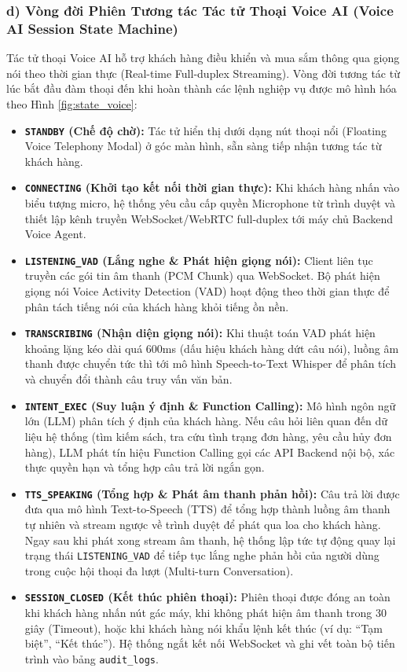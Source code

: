 \documentclass[11pt, a4paper]{report}
\begin{document}
\subsubsection{d) Vòng đời Phiên Tương tác Tác tử Thoại Voice AI (Voice AI Session State Machine)}

Tác tử thoại Voice AI hỗ trợ khách hàng điều khiển và mua sắm thông qua giọng nói theo thời gian thực (Real-time Full-duplex Streaming). Vòng đời tương tác từ lúc bắt đầu đàm thoại đến khi hoàn thành các lệnh nghiệp vụ được mô hình hóa theo Hình \ref{fig:state_voice}:
\begin{itemize}
    \item \textbf{\texttt{STANDBY} (Chế độ chờ):} Tác tử hiển thị dưới dạng nút thoại nổi (Floating Voice Telephony Modal) ở góc màn hình, sẵn sàng tiếp nhận tương tác từ khách hàng.
    \item \textbf{\texttt{CONNECTING} (Khởi tạo kết nối thời gian thực):} Khi khách hàng nhấn vào biểu tượng micro, hệ thống yêu cầu cấp quyền Microphone từ trình duyệt và thiết lập kênh truyền WebSocket/WebRTC full-duplex tới máy chủ Backend Voice Agent.
    \item \textbf{\texttt{LISTENING\_VAD} (Lắng nghe \& Phát hiện giọng nói):} Client liên tục truyền các gói tin âm thanh (PCM Chunk) qua WebSocket. Bộ phát hiện giọng nói Voice Activity Detection (VAD) hoạt động theo thời gian thực để phân tách tiếng nói của khách hàng khỏi tiếng ồn nền.
    \item \textbf{\texttt{TRANSCRIBING} (Nhận diện giọng nói):} Khi thuật toán VAD phát hiện khoảng lặng kéo dài quá 600ms (dấu hiệu khách hàng dứt câu nói), luồng âm thanh được chuyển tức thì tới mô hình Speech-to-Text Whisper để phân tích và chuyển đổi thành câu truy vấn văn bản.
    \item \textbf{\texttt{INTENT\_EXEC} (Suy luận ý định \& Function Calling):} Mô hình ngôn ngữ lớn (LLM) phân tích ý định của khách hàng. Nếu câu hỏi liên quan đến dữ liệu hệ thống (tìm kiếm sách, tra cứu tình trạng đơn hàng, yêu cầu hủy đơn hàng), LLM phát tín hiệu Function Calling gọi các API Backend nội bộ, xác thực quyền hạn và tổng hợp câu trả lời ngắn gọn.
    \item \textbf{\texttt{TTS\_SPEAKING} (Tổng hợp \& Phát âm thanh phản hồi):} Câu trả lời được đưa qua mô hình Text-to-Speech (TTS) để tổng hợp thành luồng âm thanh tự nhiên và stream ngược về trình duyệt để phát qua loa cho khách hàng. Ngay sau khi phát xong stream âm thanh, hệ thống lập tức tự động quay lại trạng thái \texttt{LISTENING\_VAD} để tiếp tục lắng nghe phản hồi của người dùng trong cuộc hội thoại đa lượt (Multi-turn Conversation).
    \item \textbf{\texttt{SESSION\_CLOSED} (Kết thúc phiên thoại):} Phiên thoại được đóng an toàn khi khách hàng nhấn nút gác máy, khi không phát hiện âm thanh trong 30 giây (Timeout), hoặc khi khách hàng nói khẩu lệnh kết thúc (ví dụ: ``Tạm biệt'', ``Kết thúc''). Hệ thống ngắt kết nối WebSocket và ghi vết toàn bộ tiến trình vào bảng \texttt{audit\_logs}.
\end{itemize}
\end{document}
